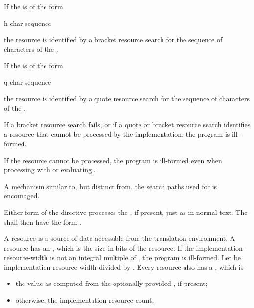 \pnum
If the  is of the form
\begin{ncsimplebnf}
\terminal{<} h-char-sequence \terminal{>}
\end{ncsimplebnf}
the resource is identified by a bracket resource search
for the sequence of characters of the .

\pnum
If the  is of the form
\begin{ncsimplebnf}
 q-char-sequence 
\end{ncsimplebnf}
the resource is identified by a quote resource search
for the sequence of characters of the .

\pnum
If a bracket resource search fails,
or if a quote or bracket resource search identifies a resource
that cannot be processed by the implementation, the program is ill-formed.
\begin{note}
If the resource cannot be processed, the program is ill-formed
even when processing  with 
or evaluating .
\end{note}

\pnum
\recommended A mechanism similar to, but distinct from, the
search paths used for 
is encouraged.

\pnum
Either form of the  directive processes the
, if present, just as in normal text.
The  shall then have the form
.

\pnum
A resource is a source of data accessible from the translation environment.
A resource has an , which is the
size in bits of the resource.
If the implementation-resource-width is not an integral multiple of
, the program is ill-formed.
Let  be
implementation-resource-width divided by .
Every resource also has a , which is

\begin{itemize}
\item
  the value as computed from the optionally-provided 
  , if present;
\item
  otherwise, the implementation-resource-count.
\end{itemize}

